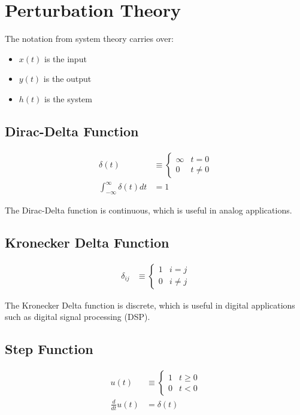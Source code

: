 \section{Perturbation Theory}

The notation from system theory carries over:
\begin{itemize}
    \item $x(t)$ is the input
    \item $y(t)$ is the output
    \item $h(t)$ is the system
\end{itemize}

\subsection{Dirac-Delta Function}

\begin{align*}
    \delta(t)                            & \equiv \begin{cases} \infty & t = 0 \\ 0 & t \neq 0 \end{cases} \\
    \int_{-\infty}^{\infty} \delta(t) dt & = 1
\end{align*}

The Dirac-Delta function is continuous, which is useful in analog applications.

\subsection{Kronecker Delta Function}

\begin{align*}
    \delta_{ij} & \equiv \begin{cases} 1 & i = j \\ 0 & i \neq j \end{cases}
\end{align*}

The Kronecker Delta function is discrete, which is useful in digital applications such as digital signal processing (DSP).

\subsection{Step Function}

\begin{align*}
    u(t)              & \equiv \begin{cases} 1 & t \ge 0 \\ 0 & t < 0 \end{cases} \\
    \frac{d}{dt} u(t) & = \delta(t)
\end{align*}

